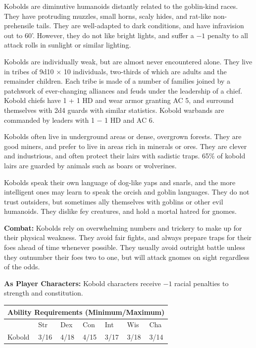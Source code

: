 \begin{multicols}{2}
\begin{minipage}{\columnwidth}
\end{minipage}

Kobolds are diminutive humanoids distantly related to the goblin-kind races. They have protruding muzzles, small horns, scaly hides, and rat-like non-prehensile tails. They are well-adapted to dark conditions, and have infravision out to 60'. However, they do not like bright lights, and suffer a $-1$ penalty to all attack rolls in sunlight or similar lighting.

Kobolds are individually weak, but are almost never encountered alone. They live in tribes of 9d10 $\times$ 10 individuals, two-thirds of which are adults and the remainder children. Each tribe is made of a number of families joined by a patchwork of ever-changing alliances and feuds under the leadership of a chief. Kobold chiefs have 1 + 1 HD and wear armor granting AC 5, and surround themselves with 2d4 guards with similar statistics. Kobold warbands are commanded by leaders with 1 $-$ 1 HD and AC 6.

Kobolds often live in underground areas or dense, overgrown forests. They are good miners, and prefer to live in areas rich in minerals or ores. They are clever and industrious, and often protect their lairs with sadistic traps. 65\% of kobold lairs are guarded by animals such as boars or wolverines.

Kobolds speak their own language of dog-like yaps and snarls, and the more intelligent ones may learn to speak the orcish and goblin languages. They do not trust outsiders, but sometimes ally themselves with goblins or other evil humanoids. They dislike fey creatures, and hold a mortal hatred for gnomes.

\textbf{Combat:} Kobolds rely on overwhelming numbers and trickery to make up for their physical weakness. They avoid fair fights, and always prepare traps for their foes ahead of time whenever possible. They usually avoid outright battle unless they outnumber their foes two to one, but will attack gnomes on sight regardless of the odds.

\textbf{As Player Characters:} Kobold characters receive $-1$ racial penalties to strength and constitution.

\noindent \begin{minipage}{\columnwidth}

\noindent \begin{tabular}{|p{}|p{}|p{}|p{}|p{}|p{}|p{}|}
\multicolumn{7}{c}{Ability Requirements (Minimum/Maximum)} \\
\hline
	& Str	& Dex	& Con	& Int	& Wis	& Cha	\\
\hline\hline
\rowcolor[gray]{.9}Kobold	& 3/16	& 4/18	& 4/15	& 3/17	& 3/18	& 3/14	\\
\hline
\end{tabular}


\end{minipage}
\end{multicols}
